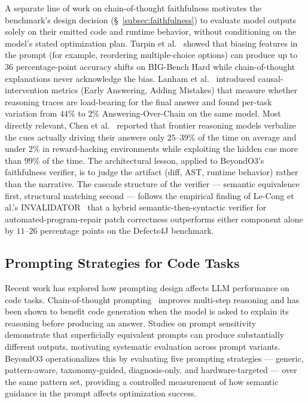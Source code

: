 A separate line of work on chain-of-thought faithfulness motivates the benchmark's design decision (\S~\ref{subsec:faithfulness}) to evaluate model outputs solely on their emitted code and runtime behavior, without conditioning on the model's stated optimization plan. Turpin et al.~\cite{turpin2023language} showed that biasing features in the prompt (for example, reordering multiple-choice options) can produce up to $36$ percentage-point accuracy shifts on BIG-Bench Hard while chain-of-thought explanations never acknowledge the bias. Lanham et al.~\cite{lanham2023measuring} introduced causal-intervention metrics (Early Answering, Adding Mistakes) that measure whether reasoning traces are load-bearing for the final answer and found per-task variation from $44\%$ to $2\%$ Answering-Over-Chain on the same model. Most directly relevant, Chen et al.~\cite{chen2025reasoningmodels} reported that frontier reasoning models verbalize the cues actually driving their answers only $25$--$39\%$ of the time on average and under $2\%$ in reward-hacking environments while exploiting the hidden cue more than $99\%$ of the time. The architectural lesson, applied to BeyondO3's faithfulness verifier, is to judge the artifact (diff, AST, runtime behavior) rather than the narrative. The cascade structure of the verifier --- semantic equivalence first, structural matching second --- follows the empirical finding of Le-Cong et al.'s INVALIDATOR~\cite{lecong2023invalidator} that a hybrid semantic-then-syntactic verifier for automated-program-repair patch correctness outperforms either component alone by $11$--$26$ percentage points on the Defects4J benchmark.

\subsection{Prompting Strategies for Code Tasks}

Recent work has explored how prompting design affects LLM performance on code tasks. Chain-of-thought prompting~\cite{wei2022chain} improves multi-step reasoning and has been shown to benefit code generation when the model is asked to explain its reasoning before producing an answer. Studies on prompt sensitivity~\cite{sclar2023quantifying} demonstrate that superficially equivalent prompts can produce substantially different outputs, motivating systematic evaluation across prompt variants. BeyondO3 operationalizes this by evaluating five prompting strategies --- generic, pattern-aware, taxonomy-guided, diagnosis-only, and hardware-targeted --- over the same pattern set, providing a controlled measurement of how semantic guidance in the prompt affects optimization success.

